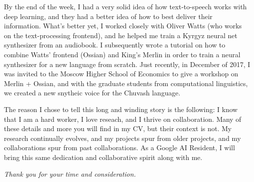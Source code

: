 \documentclass[12pt,a4paper]{article}
\begin{document}
By the end of the week, I had a very solid idea of how text-to-speech works with deep learning, and they had a better idea of how to best deliver their information. What's better yet, I worked closely with Oliver Watts (who works on the text-processing frontend), and he helped me train a Kyrgyz neural net synthesizer from an audiobook. I subsequently wrote a tutorial on how to combine Watts' frontend (Ossian) and King's Merlin in order to train a neural synthesizer for a new language from scratch. Just recently, in December of 2017, I was invited to the Moscow Higher School of Economics to give a workshop on Merlin + Ossian, and with the graduate students from computational linguistics, we created a new snytheic voice for the Chuvash language.

The reason I chose to tell this long and winding story is the following: I know that I am a hard worker, I love reseach, and I thrive on collaboration. Many of these details and more you will find in my CV, but their context is not. My research continually evolves, and my projects spur from older projects, and my collaborations spur from past collaborations. As a Google AI Resident, I will bring this same dedication and collaborative spirit along with me.






\begin{center}
\textit{Thank you for your time and consideration.}  
\end{center}
\end{document}
